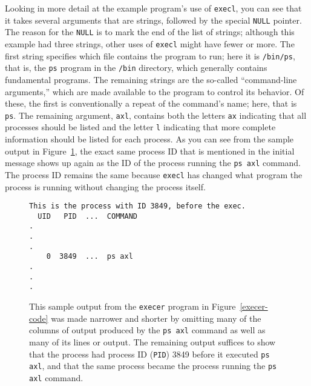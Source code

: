 Looking in more detail at the example program's use of
\verb|execl|, you can see that it takes
several arguments that are strings, followed by the special
\verb|NULL| pointer.  The reason for the \verb|NULL| is to mark the
end of the list of strings; although this example had three strings,
other uses of \verb|execl| might have fewer or more.  The first string
specifies which file contains the program to run; here it is
\verb|/bin/ps|, that is, the \verb|ps| program in the \verb|/bin|
directory, which generally contains fundamental programs.  The
remaining strings are the so-called ``command-line arguments,'' which
are made available to the program to control its behavior.  Of these,
the first is conventionally a repeat of the command's name; here, that
is \verb|ps|.  The remaining argument, \verb|axl|, contains both the
letters \verb|ax| indicating that all processes should be listed and
the letter \verb|l| indicating that more complete information should
be listed for each process.  As you can see from the sample output in
Figure~\ref{execer-output}, the exact same process ID that is
mentioned in the initial message shows up again as the ID of the process running
the \verb|ps axl| command.  The process ID remains the same because \verb|execl| has changed
what program the process is running without changing the process
itself.
\begin{figure}
\begin{verbatim}
This is the process with ID 3849, before the exec.
  UID   PID  ...  COMMAND
.
.
. 
    0  3849  ...  ps axl
.
.
.
\end{verbatim}
\caption{This sample output from the {\tt execer} program
  in Figure~\ref{execer-code} was made narrower and shorter by omitting many of
  the columns of output produced by the {\tt ps axl} command as well
  as many of its lines or output.
  The remaining output suffices to show that the process had process ID (\texttt{PID})
  3849 before it executed {\tt ps axl}, and that the same process became the process
  running the {\tt ps axl} command.}
\label{execer-output}
\end{figure}

